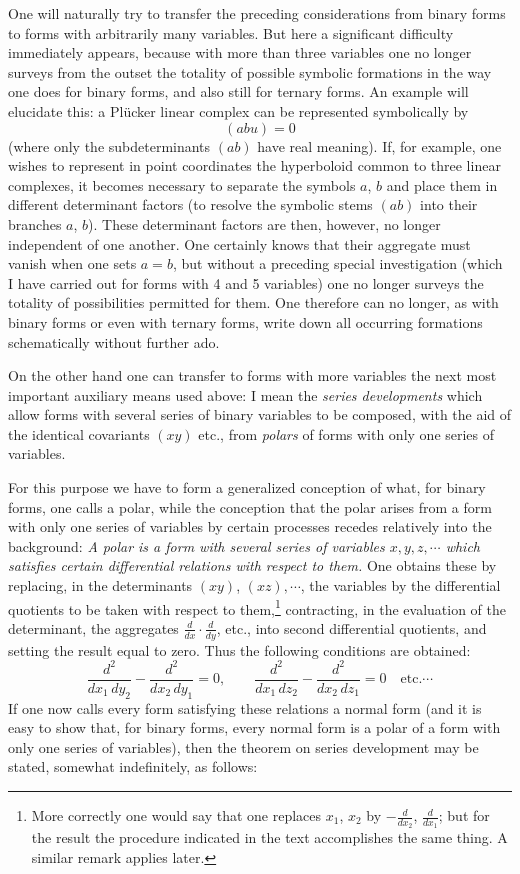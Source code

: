 \documentclass[10pt]{article}
\providecommand{\bdots}{\cdots}
\begin{document}
One will naturally try to transfer the preceding considerations from binary forms to forms with arbitrarily many variables. But here a significant difficulty immediately appears, because with more than three variables one no longer surveys from the outset the totality of possible symbolic formations in the way one does for binary forms, and also still for ternary forms. An example will elucidate this: a Plücker linear complex can be represented symbolically by
\[
(abu)=0
\]
(where only the subdeterminants $(ab)$ have real meaning). If, for example, one wishes to represent in point coordinates the hyperboloid common to three linear complexes, it becomes necessary to separate the symbols $a$, $b$ and place them in different determinant factors (to resolve the symbolic stems $(ab)$ into their branches $a$, $b$). These determinant factors are then, however, no longer independent of one another. One certainly knows that their aggregate must vanish when one sets $a=b$, but without a preceding special investigation (which I have carried out for forms with 4 and 5 variables) one no longer surveys the totality of possibilities permitted for them. One therefore can no longer, as with binary forms or even with ternary forms, write down all occurring formations schematically without further ado.

On the other hand one can transfer to forms with more variables the next most important auxiliary means used above: I mean the \textit{series developments} which allow forms with several series of binary variables to be composed, with the aid of the identical covariants $(xy)$ etc., from \textit{polars} of forms with only one series of variables.

For this purpose we have to form a generalized conception of what, for binary forms, one calls a polar, while the conception that the polar arises from a form with only one series of variables by certain processes recedes relatively into the background: \textit{A polar is a form with several series of variables $x,y,z,\bdots$ which satisfies certain differential relations with respect to them.} One obtains these by replacing, in the determinants $(xy)$, $(xz),\bdots$, the variables by the differential quotients to be taken with respect to them,\footnote{More correctly one would say that one replaces $x_1$, $x_2$ by $-\frac{d}{dx_2}$, $\frac{d}{dx_1}$; but for the result the procedure indicated in the text accomplishes the same thing. A similar remark applies later.} contracting, in the evaluation of the determinant, the aggregates $\frac d{dx}\cdot\frac d{dy}$, etc., into second differential quotients, and setting the result equal to zero. Thus the following conditions are obtained:
\[
\frac{d^2}{dx_1\,dy_2}-\frac{d^2}{dx_2\,dy_1}=0,
\qquad
\frac{d^2}{dx_1\,dz_2}-\frac{d^2}{dx_2\,dz_1}=0
\quad\text{etc.}\bdots
\]
If one now calls every form satisfying these relations a normal form (and it is easy to show that, for binary forms, every normal form is a polar of a form with only one series of variables), then the theorem on series development may be stated, somewhat indefinitely, as follows:
\end{document}
